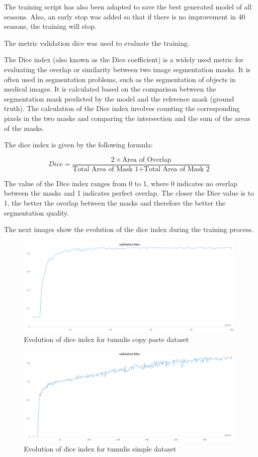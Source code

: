 The training script has also been adapted to save the best generated model of all seasons. Also, an early stop was added so that if there is no improvement in 40 seasons, the training will stop.

The metric validation dice was used to evaluate the training.

The Dice index (also known as the Dice coefficient) is a widely used metric for evaluating the overlap or similarity between two image segmentation masks. It is often used in segmentation problems, such as the segmentation of objects in medical images. It is calculated based on the comparison between the segmentation mask predicted by the model and the reference mask (ground truth). The calculation of the Dice index involves counting the corresponding pixels in the two masks and comparing the intersection and the sum of the areas of the masks.

The dice index is given by the following formula:

\begin{equation}
    Dice = \frac{2 \times \text{Area of Overlap}}{\text{Total Area of Mask 1} + \text{Total Area of Mask 2}}
\end{equation}

The value of the Dice index ranges from 0 to 1, where 0 indicates no overlap between the masks and 1 indicates perfect overlap. The closer the Dice value is to 1, the better the overlap between the masks and therefore the better the segmentation quality.

The next images show the evolution of the dice index during the training process.

\begin{figure}[H]
\centering
\includegraphics[width=12cm]{images/unet/mamoas_copy.png}
\caption{Evolution of dice index for tumulis copy paste dataset}
\end{figure}

\begin{figure}[H]
\centering
\includegraphics[width=12cm]{images/unet/mamoas_simple.png}
\caption{Evolution of dice index for tumulis simple dataset}
\end{figure}

